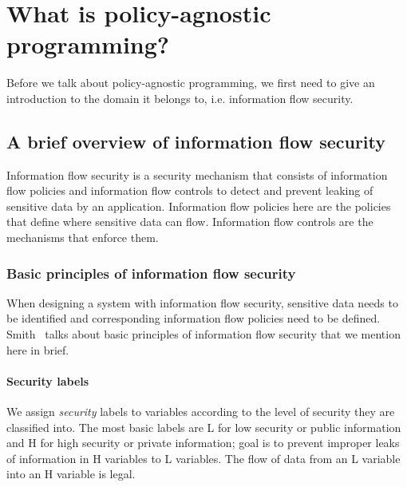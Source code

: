 \chapter{What is policy-agnostic programming?\label{chap:PAP}}

Before we talk about policy-agnostic programming, we first need to give an
introduction to the domain it belongs to, i.e. information flow security.

\section{A brief overview of information flow security}

Information flow security is a security mechanism that consists of information flow
policies and information flow controls to detect and prevent leaking of sensitive
data by an application. Information flow policies here are the policies that define
where sensitive data can flow. Information flow controls are the mechanisms that
enforce them.

\subsection{Basic principles of information flow security}
When designing a system with information flow security, sensitive data needs to
be identified and corresponding information flow policies need to be defined.
Smith~\cite{PrincInfoSec} talks about basic principles of information flow security
that we mention here in brief.
\subsubsection{Security labels}
We assign \textit{security} labels to variables
according to the level of security they are classified into. The most basic labels
are L for low security or public information and H for high security or private
information; goal is to prevent improper leaks of information in H variables to
L variables. The flow of data from an L variable into an H variable is legal.

